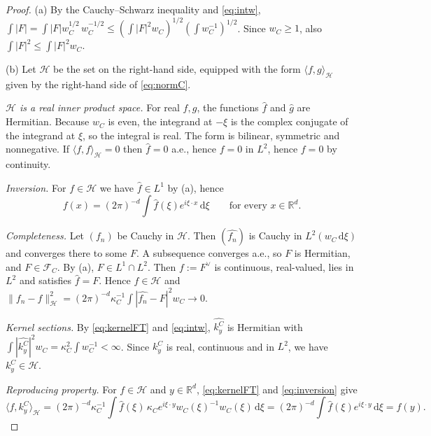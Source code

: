 \documentclass[11pt]{article}
\theoremstyle{definition}
\theoremstyle{remark}
\newcommand{\R}{\mathbb{R}}
\newcommand{\dd}{\,\mathrm{d}}
\newcommand{\FC}[1]{\mathcal{F}_{#1}}
\newcommand{\ip}[2]{\langle #1,#2\rangle}
\newcommand{\hatf}[1]{\widehat{#1}}
\begin{document}
\begin{proof}
(a) By the Cauchy--Schwarz inequality and \eqref{eq:intw},
$\int|F|=\int|F|w_C^{1/2}\,w_C^{-1/2}\le(\int|F|^2w_C)^{1/2}(\int w_C^{-1})^{1/2}$. Since $w_C\ge1$, also
$\int|F|^2\le\int|F|^2w_C$.

(b) Let $\mathcal H$ be the set on the right-hand side, equipped with the form $\ip fg_{\mathcal H}$ given by the
right-hand side of \eqref{eq:normC}.

\emph{$\mathcal H$ is a real inner product space.} For real $f,g$, the functions $\hatf f$ and $\hatf g$ are Hermitian. Because $w_C$
is even, the integrand at $-\xi$ is the complex conjugate of the integrand at $\xi$, so the integral is real.
The form is bilinear, symmetric and nonnegative. If $\ip ff_{\mathcal H}=0$ then $\hatf f=0$ a.e., hence $f=0$
in $L^2$, hence $f=0$ by continuity.

\emph{Inversion.} For $f\in\mathcal H$ we have $\hatf f\in L^1$ by (a), hence
\begin{equation}\label{eq:inversion}
f(x)=(2\pi)^{-d}\int\hatf f(\xi)e^{i\xi\cdot x}\dd\xi\qquad\text{for every }x\in\R^d .
\end{equation}

\emph{Completeness.} Let $(f_n)$ be Cauchy in $\mathcal H$. Then $(\hatf{f_n})$ is Cauchy in $L^2(w_C\dd\xi)$ and
converges there to some $F$. A subsequence converges a.e., so $F$ is Hermitian, and $F\in\FC{C}$. By (a),
$F\in L^1\cap L^2$. Then $f:=F^\vee$ is continuous, real-valued, lies in $L^2$ and satisfies $\hatf f=F$. Hence $f\in\mathcal H$ and
$\|f_n-f\|_{\mathcal H}^2=(2\pi)^{-d}\kappa_C^{-1}\int|\hatf{f_n}-F|^2w_C\to0$.

\emph{Kernel sections.} By \eqref{eq:kernelFT} and \eqref{eq:intw}, $\hatf{k^C_y}$ is Hermitian with
$\int|\hatf{k^C_y}|^2w_C=\kappa_C^2\int w_C^{-1}<\infty$. Since $k^C_y$ is real, continuous and in $L^2$, we have
$k^C_y\in\mathcal H$.

\emph{Reproducing property.} For $f\in\mathcal H$ and $y\in\R^d$, \eqref{eq:kernelFT} and \eqref{eq:inversion} give
\[
\ip f{k^C_y}_{\mathcal H}=(2\pi)^{-d}\kappa_C^{-1}\int\hatf f(\xi)\,\kappa_C e^{i\xi\cdot y}w_C(\xi)^{-1}w_C(\xi)\dd\xi
=(2\pi)^{-d}\int\hatf f(\xi)e^{i\xi\cdot y}\dd\xi=f(y).
\]


\end{proof}
\end{document}
